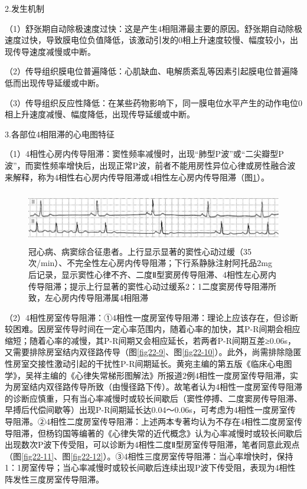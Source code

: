 2.发生机制

（1）舒张期自动除极速度过快：这是产生4相阻滞最主要的原因。舒张期自动除极速度过快，导致膜电位负值降低，该激动引发的0相上升速度较慢、幅度较小，出现传导速度减慢或中断。

（2）传导组织膜电位普遍降低：心肌缺血、电解质紊乱等因素引起膜电位普遍降低而出现传导延缓或中断。

（3）传导组织反应性降低：在某些药物影响下，同一膜电位水平产生的动作电位0相上升速度减慢、幅度降低，出现传导延缓或中断。

3.各部位4相阻滞的心电图特征

（1）4相性心房内传导阻滞：窦性频率减慢时，出现“肺型P波”或“二尖瓣型P波”，而窦性频率增快后，出现正常P波，前者不能用房性异位心律或房性融合波来解释，称为4相性右心房内传导阻滞或4相性左心房内传导阻滞（图\ref{fig22-8}）。

\begin{figure}[!htbp]
 \centering
 \includegraphics[width=5.80208in,height=0.91667in]{./images/Image00374.jpg}
 \captionsetup{justification=centering}
 \caption{冠心病、病窦综合征患者。上行显示显著的窦性心动过缓（35次/min）、不完全性左心房内传导阻滞；下行系静脉注射阿托品2mg后记录，显示窦性心律不齐、二度Ⅱ型窦房传导阻滞、4相性左心房内传导阻滞；提示上行显著的窦性心动过缓系2：1二度窦房传导阻滞所致，左心房内传导阻滞属4相阻滞}
 \label{fig22-8}
  \end{figure} 

（2）4相性房室传导阻滞：①4相性一度房室传导阻滞：理论上应该存在，但诊断较困难。因房室传导时间在一定心率范围内，随着心率的加快，其P-R间期会相应缩短；随着心率的减慢，其P-R间期又会相应延长，若两者P-R间期互差≥0.06s，又需要排除房室结内双径路传导（图\ref{fig22-9}、图\ref{fig22-10}）。此外，尚需排除隐匿性房室交接性激动引起的干扰性P-R间期延长。黄宛主编的第五版《临床心电图学》，吴祥主编的《心律失常梯形图解法》所报道2例4相性一度房室传导阻滞，实为房室结内双径路传导所致（由慢径路下传）。故笔者认为4相性一度房室传导阻滞的诊断应慎重，只有当心率减慢时或较长间歇后（窦性停搏、二度窦房传导阻滞、早搏后代偿间歇等）出现P-R间期延长达0.04～0.06s，可考虑为4相性一度房室传导阻滞。②4相性二度房室传导阻滞：上述两本专著均认为不存在4相性二度房室传导阻滞，但杨钧国等编著的《心律失常的近代概念》认为心率减慢时或较长间歇后出现数次P波下传受阻，可以诊断为4相性二度Ⅱ型房室传导阻滞，笔者同意此观点（图\ref{fig22-11}、图\ref{fig22-12}）。③4相性三度房室传导阻滞：当心率增快时，保持1：1房室传导；当心率减慢时或较长间歇后连续出现P波下传受阻，表现为4相性阵发性三度房室传导阻滞。

